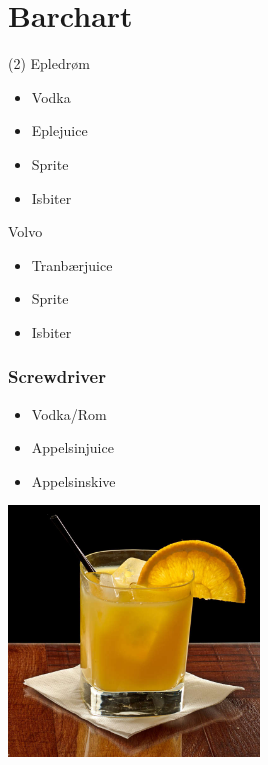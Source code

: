 \documentclass[a4paper,norsk]{article}
\begin{document}
\maketitle
\section*{Barchart}




	\begin{tasks}(2)
		\task Epledrøm
		\begin{itemize}
		\item Vodka
		\item Eplejuice
		\item Sprite
		\item Isbiter
		\end{itemize}
		
		\task Volvo
		\begin{itemize}
  		\item Tranbærjuice
		\item Sprite
		\item Isbiter
		\end{itemize}		
		



	\end{tasks}

\newpage
\subsubsection*{Screwdriver}
\begin{minipage}[c]{0.45\textwidth}
\begin{itemize}
		\item Vodka/Rom
		\item Appelsinjuice
		\item Appelsinskive
\end{itemize}
\end{minipage}
\hfill
\begin{minipage}[c]{0.45\textwidth}
  \includegraphics[width=0.5\textwidth]{screwdriver.jpg}
\end{minipage}
\end{document}
